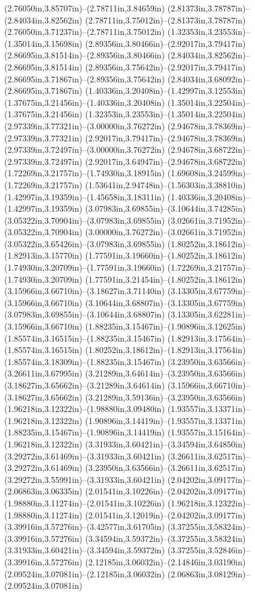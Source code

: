 (2.76050in,3.85707in)--(2.78711in,3.84659in) (2.81373in,3.78787in)--(2.84034in,3.82562in) (2.78711in,3.75012in)--(2.81373in,3.78787in) (2.76050in,3.71237in)--(2.78711in,3.75012in) (1.32353in,3.23553in)--(1.35014in,3.15698in) (2.89356in,3.80466in)--(2.92017in,3.79417in) (2.86695in,3.81514in)--(2.89356in,3.80466in) (2.84034in,3.82562in)--(2.86695in,3.81514in) (2.89356in,3.75642in)--(2.92017in,3.79417in) (2.86695in,3.71867in)--(2.89356in,3.75642in) (2.84034in,3.68092in)--(2.86695in,3.71867in) (1.40336in,3.20408in)--(1.42997in,3.12553in) (1.37675in,3.21456in)--(1.40336in,3.20408in) (1.35014in,3.22504in)--(1.37675in,3.21456in) (1.32353in,3.23553in)--(1.35014in,3.22504in) (2.97339in,3.77321in)--(3.00000in,3.76272in) (2.94678in,3.78369in)--(2.97339in,3.77321in) (2.92017in,3.79417in)--(2.94678in,3.78369in) (2.97339in,3.72497in)--(3.00000in,3.76272in) (2.94678in,3.68722in)--(2.97339in,3.72497in) (2.92017in,3.64947in)--(2.94678in,3.68722in) (1.72269in,3.21757in)--(1.74930in,3.18915in) (1.69608in,3.24599in)--(1.72269in,3.21757in) (1.53641in,2.94748in)--(1.56303in,3.38810in) (1.42997in,3.19359in)--(1.45658in,3.18311in) (1.40336in,3.20408in)--(1.42997in,3.19359in) (3.07983in,3.69855in)--(3.10644in,3.74285in) (3.05322in,3.70904in)--(3.07983in,3.69855in) (3.02661in,3.71952in)--(3.05322in,3.70904in) (3.00000in,3.76272in)--(3.02661in,3.71952in) (3.05322in,3.65426in)--(3.07983in,3.69855in) (1.80252in,3.18612in)--(1.82913in,3.15770in) (1.77591in,3.19660in)--(1.80252in,3.18612in) (1.74930in,3.20709in)--(1.77591in,3.19660in) (1.72269in,3.21757in)--(1.74930in,3.20709in) (1.77591in,3.21454in)--(1.80252in,3.18612in) (3.15966in,3.66710in)--(3.18627in,3.71140in) (3.13305in,3.67759in)--(3.15966in,3.66710in) (3.10644in,3.68807in)--(3.13305in,3.67759in) (3.07983in,3.69855in)--(3.10644in,3.68807in) (3.13305in,3.62281in)--(3.15966in,3.66710in) (1.88235in,3.15467in)--(1.90896in,3.12625in) (1.85574in,3.16515in)--(1.88235in,3.15467in) (1.82913in,3.17564in)--(1.85574in,3.16515in) (1.80252in,3.18612in)--(1.82913in,3.17564in) (1.85574in,3.18309in)--(1.88235in,3.15467in) (3.23950in,3.63566in)--(3.26611in,3.67995in) (3.21289in,3.64614in)--(3.23950in,3.63566in) (3.18627in,3.65662in)--(3.21289in,3.64614in) (3.15966in,3.66710in)--(3.18627in,3.65662in) (3.21289in,3.59136in)--(3.23950in,3.63566in) (1.96218in,3.12322in)--(1.98880in,3.09480in) (1.93557in,3.13371in)--(1.96218in,3.12322in) (1.90896in,3.14419in)--(1.93557in,3.13371in) (1.88235in,3.15467in)--(1.90896in,3.14419in) (1.93557in,3.15164in)--(1.96218in,3.12322in) (3.31933in,3.60421in)--(3.34594in,3.64850in) (3.29272in,3.61469in)--(3.31933in,3.60421in) (3.26611in,3.62517in)--(3.29272in,3.61469in) (3.23950in,3.63566in)--(3.26611in,3.62517in) (3.29272in,3.55991in)--(3.31933in,3.60421in) (2.04202in,3.09177in)--(2.06863in,3.06335in) (2.01541in,3.10226in)--(2.04202in,3.09177in) (1.98880in,3.11274in)--(2.01541in,3.10226in) (1.96218in,3.12322in)--(1.98880in,3.11274in) (2.01541in,3.12019in)--(2.04202in,3.09177in) (3.39916in,3.57276in)--(3.42577in,3.61705in) (3.37255in,3.58324in)--(3.39916in,3.57276in) (3.34594in,3.59372in)--(3.37255in,3.58324in) (3.31933in,3.60421in)--(3.34594in,3.59372in) (3.37255in,3.52846in)--(3.39916in,3.57276in) (2.12185in,3.06032in)--(2.14846in,3.03190in) (2.09524in,3.07081in)--(2.12185in,3.06032in) (2.06863in,3.08129in)--(2.09524in,3.07081in) 